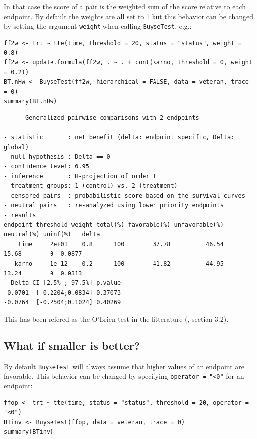\documentclass[12pt]{article}
\begin{document}
In that case the score of a pair is the weighted sum of the score
relative to each endpoint. By default the weights are all set to 1 but
this behavior can be changed by setting the argument \texttt{weight} when
calling \texttt{BuyseTest}, e.g.:
\lstset{language=r,label= ,caption= ,captionpos=b,numbers=none}
\begin{lstlisting}
ff2w <- trt ~ tte(time, threshold = 20, status = "status", weight = 0.8)
ff2w <- update.formula(ff2w, . ~ . + cont(karno, threshold = 0, weight = 0.2))
BT.nHw <- BuyseTest(ff2w, hierarchical = FALSE, data = veteran, trace = 0)
summary(BT.nHw)
\end{lstlisting}

\begin{verbatim}
      Generalized pairwise comparisons with 2 endpoints

- statistic       : net benefit (delta: endpoint specific, Delta: global) 
- null hypothesis : Delta == 0 
- confidence level: 0.95 
- inference       : H-projection of order 1
- treatment groups: 1 (control) vs. 2 (treatment) 
- censored pairs  : probabilistic score based on the survival curves
- neutral pairs   : re-analyzed using lower priority endpoints
- results
endpoint threshold weight total(%) favorable(%) unfavorable(%) neutral(%) uninf(%)   delta
    time     2e+01    0.8      100        37.78          46.54      15.68        0 -0.0877
   karno     1e-12    0.2      100        41.82          44.95      13.24        0 -0.0313
  Delta CI [2.5% ; 97.5%] p.value 
-0.0701  [-0.2204;0.0834] 0.37073 
-0.0764  [-0.2504;0.1024] 0.40269
\end{verbatim}
This has been refered as the O’Brien test in the litterature
(\cite{verbeeck2019generalized}, section 3.2).

\clearpage

\subsection{What if smaller is better?}
\label{sec:orge91dcfb}
By default \texttt{BuyseTest} will always assume that higher values of an
endpoint are favorable. This behavior can be changed by specifying \texttt{operator = "<0"}
for an endpoint:
\lstset{language=r,label= ,caption= ,captionpos=b,numbers=none}
\begin{lstlisting}
ffop <- trt ~ tte(time, status = "status", threshold = 20, operator = "<0")
BTinv <- BuyseTest(ffop, data = veteran, trace = 0)
summary(BTinv)
\end{lstlisting}
\end{document}
